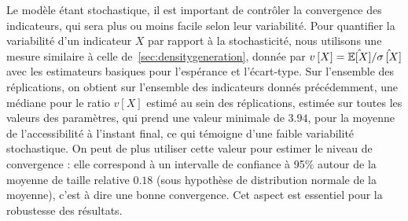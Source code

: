 Le modèle étant stochastique, il est important de contrôler la convergence des indicateurs, qui sera plus ou moins facile selon leur variabilité. Pour quantifier la variabilité d'un indicateur $X$ par rapport à la stochasticité, nous utilisons une mesure similaire à celle de~\ref{sec:densitygeneration}, donnée par $v\left[X\right] = \hat{\operatorname{\mathbb{E}}\!\left[X\right]}/\hat{\sigma\left[X\right]}$ avec les estimateurs basiques pour l'espérance et l'écart-type. Sur l'ensemble des réplications, on obtient sur l'ensemble des indicateurs donnés précédemment, une médiane pour le ratio $v\left[X\right]$ estimé au sein des réplications, estimée sur toutes les valeurs des paramètres, qui prend une valeur minimale de $3.94$, pour la moyenne de l'accessibilité à l'instant final, ce qui témoigne d'une faible variabilité stochastique. On peut de plus utiliser cette valeur pour estimer le niveau de convergence : elle correspond à un intervalle de confiance à 95\% autour de la moyenne de taille relative $0.18$ (sous hypothèse de distribution normale de la moyenne), c'est à dire une bonne convergence. Cet aspect est essentiel pour la robustesse des résultats.




